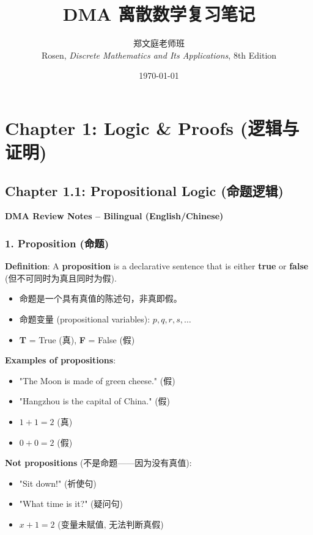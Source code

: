 \documentclass[10pt,a4paper,openany]{ctexbook}
\title{\Huge \textbf{DMA 离散数学复习笔记}}
\author{
    \Large 郑文庭老师班 \\
    \large Rosen, \textit{Discrete Mathematics and Its Applications}, 8th Edition
}
\date{\large \today}
\theoremstyle{definition}
\theoremstyle{remark}
\renewenvironment{quote}
  {\list{}{\leftmargin=1em\rightmargin=0pt\topsep=0.5pt\partopsep=0pt}\item[]}
  {\endlist}
\begin{document}
\maketitle
{\small\tableofcontents}
\newpage
\small

\chapter{Chapter 1: Logic \& Proofs (逻辑与证明)}

\section{Chapter 1.1: Propositional Logic (命题逻辑)}

\begin{quote}
\textbf{DMA Review Notes -- Bilingual (English/Chinese)}

\end{quote}
\vspace{-2pt}

\subsection{1. Proposition (命题)}

\textbf{Definition}: A \textbf{proposition} is a declarative sentence that is either \textbf{true} or \textbf{false} (但不可同时为真且同时为假).
\begin{itemize}
\item 命题是一个具有真值的陈述句，非真即假。
\item 命题变量 (propositional variables): $p, q, r, s, \dots$
\item \textbf{T} = True (真), \textbf{F} = False (假)

\end{itemize}

\textbf{Examples of propositions}:
\begin{itemize}
\item "The Moon is made of green cheese." (假)
\item "Hangzhou is the capital of China." (假)
\item $1 + 1 = 2$ (真)
\item $0 + 0 = 2$ (假)

\end{itemize}

\textbf{Not propositions} (不是命题——因为没有真值):
\begin{itemize}
\item "Sit down!" (祈使句)
\item "What time is it?" (疑问句)
\item $x + 1 = 2$ (变量未赋值, 无法判断真假)

\end{itemize}
\end{document}
